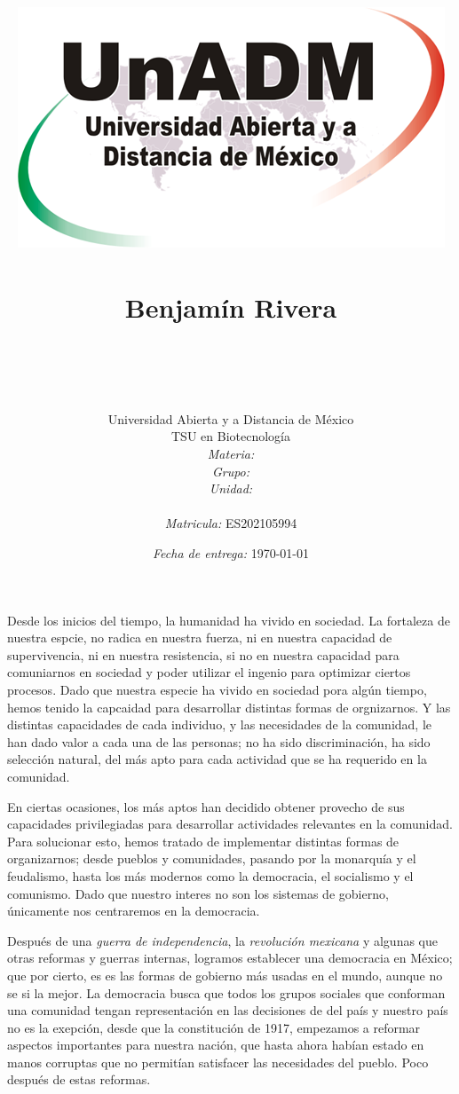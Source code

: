 \documentclass[12pt]{article}
\title{
	\includegraphics{../../../assets/logo-unadm} \\
	\ \\ Benjam\'in Rivera \\
	\bf{\titulo}\\\ \\}
\author{
	Universidad Abierta y a Distancia de México \\
	TSU en Biotecnolog\'ia \\
	\textit{Materia:} \materia \\
	\textit{Grupo:} \grupo \\
	\textit{Unidad:} \unidad \\
	\\
	\textit{Matricula:} ES202105994 }
\date{\textit{Fecha de entrega:} \today}
\begin{document}
\maketitle\newpage

	\par Desde los inicios del tiempo, la humanidad ha vivido en sociedad. La fortaleza de nuestra espcie, no radica en nuestra fuerza, ni en nuestra capacidad de supervivencia, ni en nuestra resistencia, si no en nuestra capacidad para comuniarnos en sociedad y poder utilizar el ingenio para optimizar ciertos procesos. Dado que nuestra especie ha vivido en sociedad pora alg\'un tiempo, hemos tenido la capcaidad para desarrollar distintas formas de orgnizarnos. Y las distintas capacidades de cada individuo, y las necesidades de la comunidad, le han dado valor a cada una de las personas; no ha sido discriminaci\'on, ha sido selecci\'on natural, del m\'as apto para cada actividad que se ha requerido en la comunidad.
	
	\par En ciertas ocasiones, los m\'as aptos han decidido obtener provecho de sus capacidades privilegiadas para desarrollar actividades relevantes en la comunidad. Para solucionar esto, hemos tratado de implementar distintas formas de organizarnos; desde pueblos y comunidades, pasando por la monarqu\'ia y el feudalismo, hasta los m\'as modernos como la democracia, el socialismo y el comunismo. Dado que nuestro interes no son los sistemas de gobierno, \'unicamente nos centraremos en la democracia.
	
	\par Despu\'es de una \textit{guerra de independencia}, la \textit{revoluci\'on mexicana} y algunas que otras reformas y guerras internas, logramos establecer una democracia en M\'exico; que por cierto, es es las formas de gobierno m\'as usadas en el mundo, aunque no se si la mejor. La democracia busca que todos los grupos sociales que conforman una comunidad	tengan representaci\'on en las decisiones de del pa\'is y nuestro pa\'is no es la exepci\'on, desde que la constituci\'on de 1917, empezamos a reformar aspectos importantes para nuestra naci\'on, que hasta ahora hab\'ian estado en manos corruptas que no permit\'ian satisfacer las necesidades del pueblo. Poco despu\'es de estas reformas. 
	
\end{document}
